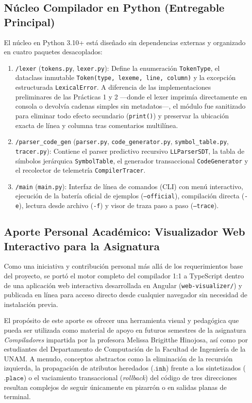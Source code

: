 \documentclass[11pt, letterpaper]{article}
\begin{document}
\subsection{Núcleo Compilador en Python (Entregable Principal)}
El núcleo en Python 3.10+ está diseñado sin dependencias externas y organizado en cuatro paquetes desacoplados:
\begin{enumerate}[leftmargin=1.8em]
    \item \texttt{/lexer} (\texttt{tokens.py}, \texttt{lexer.py}): Define la enumeración \texttt{TokenType}, el dataclass inmutable \texttt{Token(type, lexeme, line, column)} y la excepción estructurada \texttt{LexicalError}. A diferencia de las implementaciones preliminares de las Prácticas 1 y 2 —donde el lexer imprimía directamente en consola o devolvía cadenas simples sin metadatos—, el módulo fue sanitizado para eliminar todo efecto secundario (\texttt{print()}) y preservar la ubicación exacta de línea y columna tras comentarios multilínea.
    \item \texttt{/parser\_code\_gen} (\texttt{parser.py}, \texttt{code\_generator.py}, \texttt{symbol\_table.py}, \texttt{tracer.py}): Contiene el parser predictivo recursivo \texttt{LLParserSDT}, la tabla de símbolos jerárquica \texttt{SymbolTable}, el generador transaccional \texttt{CodeGenerator} y el recolector de telemetría \texttt{CompilerTracer}.
    \item \texttt{/main} (\texttt{main.py}): Interfaz de línea de comandos (CLI) con menú interactivo, ejecución de la batería oficial de ejemplos (\texttt{--official}), compilación directa (\texttt{-e}), lectura desde archivo (\texttt{-f}) y visor de traza paso a paso (\texttt{--trace}).
\end{enumerate}

\subsection{Aporte Personal Académico: Visualizador Web Interactivo para la Asignatura}
Como una iniciativa y contribución personal más allá de los requerimientos base del proyecto, se portó el motor completo del compilador 1:1 a TypeScript dentro de una aplicación web interactiva desarrollada en Angular (\texttt{web-visualizer/}) y publicada en línea para acceso directo desde cualquier navegador sin necesidad de instalación previa.

El propósito de este aporte es ofrecer una herramienta visual y pedagógica que pueda ser utilizada como material de apoyo en futuros semestres de la asignatura \textit{Compiladores} impartida por la profesora Melissa Brigitthe Hinojosa, así como por estudiantes del Departamento de Computación de la Facultad de Ingeniería de la UNAM. A menudo, conceptos abstractos como la eliminación de la recursión izquierda, la propagación de atributos heredados ($\texttt{.inh}$) frente a los sintetizados ($\texttt{.place}$) o el vaciamiento transaccional (\textit{rollback}) del código de tres direcciones resultan complejos de seguir únicamente en pizarrón o en salidas planas de terminal.
\end{document}
